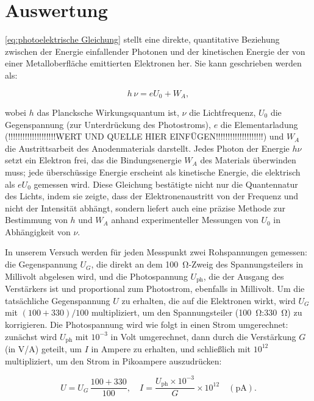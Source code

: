 \section{Auswertung}
\cref{eq:photoelektrische Gleichung} stellt eine direkte, quantitative Beziehung zwischen der Energie einfallender Photonen und der kinetischen Energie der von einer Metalloberfläche emittierten Elektronen her. Sie kann geschrieben werden als:

\begin{equation}
    h\,\nu = e U_{0} + W_{A},
\end{equation}

wobei $h$ das Plancksche Wirkungsquantum ist, $\nu$ die Lichtfrequenz, $U_{0}$ die Gegenspannung (zur Unterdrückung des Photostroms), $e$ die Elementarladung (!!!!!!!!!!!!!!!!!!!!WERT UND QUELLE HIER EINFÜGEN!!!!!!!!!!!!!!!!!!!!) und $W_{A}$ die Austrittsarbeit des Anodenmaterials darstellt. Jedes Photon der Energie $h\nu$ setzt ein Elektron frei, das die Bindungsenergie $W_{A}$ des Materials überwinden muss; jede überschüssige Energie erscheint als kinetische Energie, die elektrisch als $eU_{0}$ gemessen wird. Diese Gleichung bestätigte nicht nur die Quanten­natur des Lichts, indem sie zeigte, dass der Elektronenaustritt von der Frequenz und nicht der Intensität abhängt, sondern liefert auch eine präzise Methode zur Bestimmung von $h$ und $W_{A}$ anhand experimenteller Messungen von $U_{0}$ in Abhängigkeit von $\nu$.

In unserem Versuch werden für jeden Messpunkt zwei Rohspannungen gemessen: die Gegenspannung $U_{G}$, die direkt an dem \SI{100}{\ohm}-Zweig des Spannungsteilers in Millivolt abgelesen wird, und die Photospannung $U_{\mathrm{ph}}$, die der Ausgang des Verstärkers ist und proportional zum Photostrom, ebenfalls in Millivolt. Um die tatsächliche Gegenspannung $U$ zu erhalten, die auf die Elektronen wirkt, wird $U_{G}$ mit $(100+330)/100$ multipliziert, um den Spannungsteiler (\SI{100}{\ohm}:\SI{330}{\ohm}) zu korrigieren. Die Photospannung wird wie folgt in einen Strom umgerechnet: zunächst wird $U_{\mathrm{ph}}$ mit $10^{-3}$ in Volt umgerechnet, dann durch die Verstärkung $G$ (in V/A) geteilt, um $I$ in Ampere zu erhalten, und schließlich mit $10^{12}$ multipliziert, um den Strom in Pikoampere auszudrücken:

\begin{equation}
  U = U_{G}\,\frac{100 + 330}{100},\quad
  I = \frac{U_{\mathrm{ph}}\times10^{-3}}{G}\times10^{12}
  \quad(\mathrm{pA}).
\end{equation}

